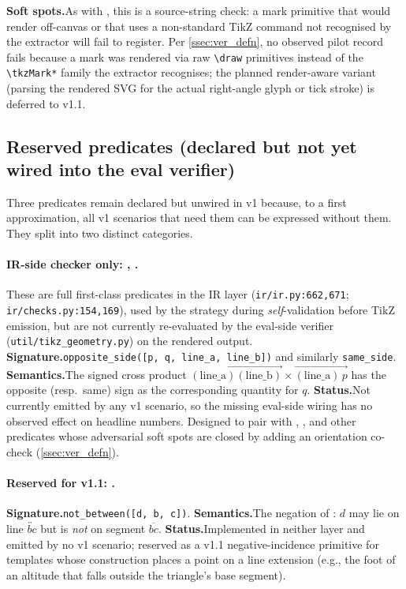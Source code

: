 \noindent\textbf{Soft spots.}\quad As with , this is a source-string check: a mark primitive that would render off-canvas or that uses a non-standard TikZ command not recognised by the extractor will fail to register.
Per \cref{ssec:ver_defn}, no observed pilot record fails because a mark was rendered via raw \texttt{\textbackslash draw} primitives instead of the \texttt{\textbackslash tkzMark*} family the extractor recognises; the planned render-aware variant (parsing the rendered SVG for the actual right-angle glyph or tick stroke) is deferred to v1.1.

\subsection{Reserved predicates (declared but not yet wired into the eval verifier)}
\label{app:reserved_predicates}

Three predicates remain declared but unwired in v1 because, to a first approximation, all v1 scenarios that need them can be expressed without them.
They split into two distinct categories.

\paragraph{IR-side checker only: , .}
These are full first-class predicates in the IR layer (\texttt{ir/ir.py:662,671}; \texttt{ir/checks.py:154,169}), used by the \structured strategy during \emph{self}-validation before TikZ emission, but are not currently re-evaluated by the eval-side verifier (\texttt{util/tikz\_geometry.py}) on the rendered output.
\textbf{Signature.}\quad \texttt{opposite\_side([p, q, line\_a, line\_b])} and similarly \texttt{same\_side}.
\textbf{Semantics.}\quad The signed cross product $\vec{(\text{line\_a})(\text{line\_b})} \times \vec{(\text{line\_a})\,p}$ has the opposite (resp.\ same) sign as the corresponding quantity for $q$.
\textbf{Status.}\quad Not currently emitted by any v1 scenario, so the missing eval-side wiring has no observed effect on headline numbers.
Designed to pair with , , and other predicates whose adversarial soft spots are closed by adding an orientation co-check (\cref{ssec:ver_defn}).

\paragraph{Reserved for v1.1: .}
\textbf{Signature.}\quad \texttt{not\_between([d, b, c])}.
\textbf{Semantics.}\quad The negation of : $d$ may lie on line $\overleftrightarrow{bc}$ but is \emph{not} on segment $\overline{bc}$.
\textbf{Status.}\quad Implemented in neither layer and emitted by no v1 scenario; reserved as a v1.1 negative-incidence primitive for templates whose construction places a point on a line extension (e.g., the foot of an altitude that falls outside the triangle's base segment).

